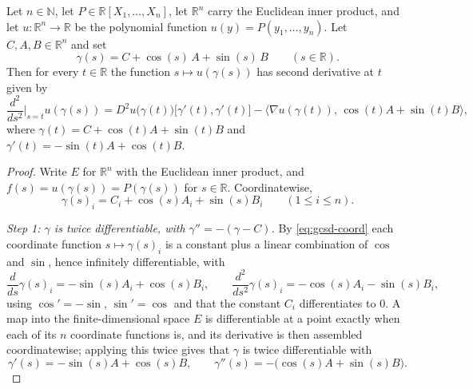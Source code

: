 \begin{lemma}
Let $n\in\mathbb{N}$, let $P\in\mathbb{R}[X_1,\dots,X_n]$, let $\mathbb{R}^n$
carry the Euclidean inner product, and let $u:\mathbb{R}^n\to\mathbb{R}$ be the
polynomial function $u(y)=P(y_1,\dots,y_n)$. Let $C,A,B\in\mathbb{R}^n$ and set
\[
  \gamma(s)=C+\cos(s)\,A+\sin(s)\,B\qquad(s\in\mathbb{R}).
\]
Then for every $t\in\mathbb{R}$ the function $s\mapsto u(\gamma(s))$ has second
derivative at $t$ given by
\[
  \frac{d^2}{ds^2}\Big|_{s=t}u(\gamma(s))
  =D^2u\bigl(\gamma(t)\bigr)\bigl[\gamma'(t),\gamma'(t)\bigr]
   -\bigl\langle\nabla u(\gamma(t)),\,\cos(t)A+\sin(t)B\bigr\rangle ,
\]
where $\gamma(t)=C+\cos(t)A+\sin(t)B$ and $\gamma'(t)=-\sin(t)A+\cos(t)B$.
\end{lemma}
\begin{proof}
Write $E$ for $\mathbb{R}^n$ with the Euclidean inner product, and
$f(s)=u(\gamma(s))=P(\gamma(s))$ for $s\in\mathbb{R}$. Coordinatewise,
\begin{equation}\label{eq:gcsd-coord}
  \gamma(s)_i=C_i+\cos(s)A_i+\sin(s)B_i\qquad(1\le i\le n).
\end{equation}

\emph{Step 1: $\gamma$ is twice differentiable, with
$\gamma''=-(\gamma-C)$.} By \eqref{eq:gcsd-coord} each coordinate function
$s\mapsto\gamma(s)_i$ is a constant plus a linear combination of $\cos$ and
$\sin$, hence infinitely differentiable, with
\[
  \frac{d}{ds}\gamma(s)_i=-\sin(s)A_i+\cos(s)B_i,
  \qquad
  \frac{d^2}{ds^2}\gamma(s)_i=-\cos(s)A_i-\sin(s)B_i,
\]
using $\cos'=-\sin$, $\sin'=\cos$ and that the constant $C_i$ differentiates to
$0$. A map into the finite-dimensional space $E$ is differentiable at a point
exactly when each of its $n$ coordinate functions is, and its derivative is then
assembled coordinatewise; applying this twice gives that $\gamma$ is twice
differentiable with
\begin{equation}\label{eq:gcsd-gamma}
  \gamma'(s)=-\sin(s)A+\cos(s)B,
  \qquad
  \gamma''(s)=-\bigl(\cos(s)A+\sin(s)B\bigr).
\end{equation}


\end{proof}
